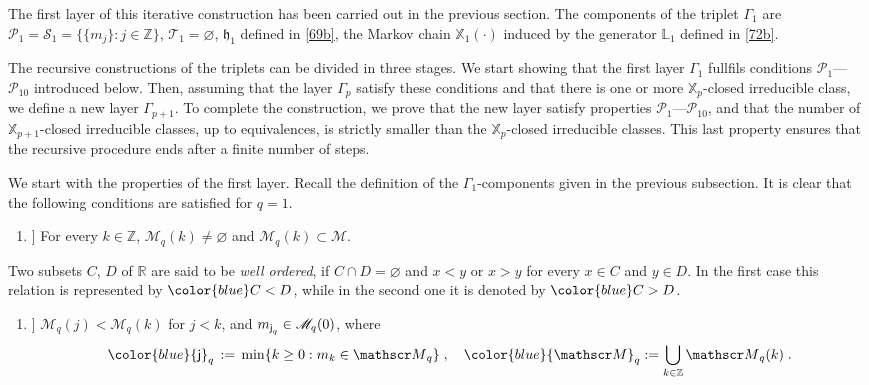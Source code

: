 \documentclass[reqno]{amsart}
\theoremstyle{plain}
\theoremstyle{definition}
\newcommand{\mc}[1]{{\mathcal #1}}
\newcommand{\mf}[1]{{\mathfrak #1}}
\newcommand{\bb}[1]{{\mathbb #1}}
\newcommand{\ms}[1]{{\mathscr #1}}
\newcommand{\mss}[1]{{\textsf #1}}
\newcounter{as}[section]
\newcommand{\<}{\langle}
\renewcommand{\>}{\rangle}
\begin{document}
The first layer of this iterative construction has been carried out in
the previous section. The components of the triplet $\Gamma_1$ are
$\mc P_1 = \ms S_1 = \{ \{m_j\} : j\in \bb Z\}$,
$\ms T_1=\varnothing$, $\mf h_1$ defined in \eqref{69b}, the Markov
chain $\bb X_1(\cdot)$ induced by the generator $\bb L_1$ defined in
\eqref{72b}.

The recursive constructions of the triplets can be divided in three
stages.  We start showing that the first layer $\Gamma_1$ fullfils
conditions $\mc P_1$---$\mc P_{10}$ introduced below. Then, assuming
that the layer $\Gamma_p$ satisfy these conditions and that there is
one or more $\bb X_p$-closed irreducible class, we define a new layer
$\Gamma_{p+1}$. To complete the construction, we prove that the new
layer satisfy properties $\mc P_1$---$\mc P_{10}$, and that the number
of $\bb X_{p+1}$-closed irreducible classes, up to equivalences, is
strictly smaller than the $\bb X_p$-closed irreducible classes. This
last property ensures that the recursive procedure ends after a finite
number of steps.

We start with the properties of the first layer.  Recall the
definition of the $\Gamma_1$-components given in the previous
subsection.  It is clear that the following conditions are satisfied
for $q=1$.


\begin{enumerate}
\item[[$\mc P_1(q)$\!\!\!]] For every $k\in \bb Z$,
$\ms M_{q}(k)\neq \varnothing$ and $\ms M_{q}(k) \subset \mc M$.
\end{enumerate}

Two subsets $C$, $D$ of $\bb R$ are said to be {\it well ordered}, if
$C\cap D = \varnothing$ and $x<y$ or $x>y$ for every $x\in C$ and
$y\in D$. In the first case this relation is represented by
$\color{blue} C<D$, while in the second one it is denoted by
$\color{blue} C>D$. 

\begin{enumerate}

\item[[$\mc P_2(q)$\!\!\!]]  $\ms M_{q}(j) < \ms M_{q}(k)$ for $j<k$,
and $m_{\mss j_q} \in \ms M_q(0)$, where
\begin{equation}
\label{24b}
{\color{blue} \mss j_q } \,:=\, \min\{k\ge 0 : m_k \in \ms M_q\}\;,
\quad
{\color{blue}\ms M_{q}} := \bigcup_{k\in \bb Z}\ms M_{q}(k)\;.
\end{equation}
\end{enumerate}
\end{document}
